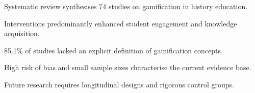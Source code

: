 \documentclass[a4paper,fleqn]{cas-sc}
\begin{document}

\begin{highlights}
	\item Systematic review synthesises 74 studies on gamification in history education.
	\item Interventions predominantly enhanced student engagement and knowledge acquisition.
	\item 85.1\% of studies lacked an explicit definition of gamification concepts.
	\item High risk of bias and small sample sizes characterise the current evidence base.
	\item Future research requires longitudinal designs and rigorous control groups.
\end{highlights}
	


\maketitle
\end{document}
